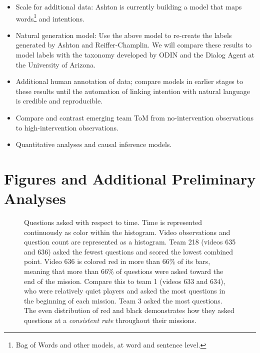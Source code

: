 \begin{itemize}
    \item Scale for additional data: Ashton is currently building a model that maps words\footnote{Bag of Words and other models, at word and sentence level.} and intentions.
    \item Natural generation model: Use the above model to re-create the labels
        generated by Ashton and Reiffer-Champlin. We will compare these results
        to model labels with the taxonomy developed by ODIN and the Dialog
        Agent at the University of Arizona.
    \item Additional human annotation of data; compare models in earlier stages to these results until the automation of linking intention with natural language is credible and reproducible.
    \item Compare and contrast emerging team ToM from no-intervention observations to high-intervention observations.
    \item Quantitative analyses and causal inference models.
\end{itemize}



\section{Figures and Additional Preliminary Analyses}

\begin{figure}[h!]
    \centering
    \caption{%
        Questions asked with respect to time. Time is represented continuously
        as color within the histogram. Video observations and question count
        are represented as a histogram. Team 218 (videos 635 and 636) asked the
        fewest questions and scored the lowest combined point. Video 636 is
        colored red in more than 66\% of its bars, meaning that more than 66\%
        of questions were asked toward the end of the mission. Compare this to
        team 1 (videos 633 and 634), who were relatively quiet players and
        asked the most questions in the beginning of each mission. Team 3 asked
        the most questions. The even distribution of red and black demonstrates
        how they asked questions at a \emph{consistent rate} throughout their
        missions.
    }
    \end{figure}
    



